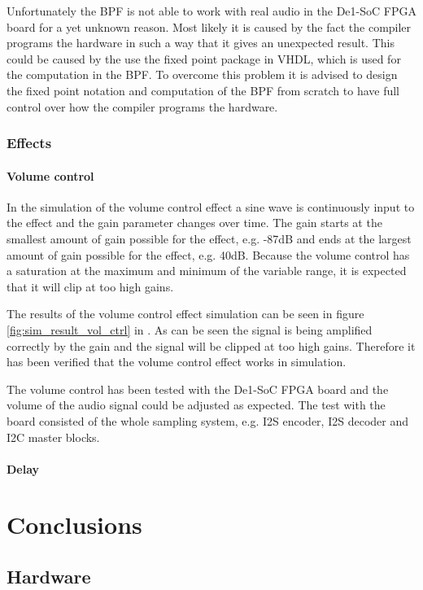 Unfortunately the BPF is not able to work with real audio in the De1-SoC FPGA board for a yet unknown reason. Most likely it is caused by the fact the compiler programs the hardware in such a way that it gives an unexpected result. This could be caused by the use the fixed point package in VHDL, which is used for the computation in the BPF. To overcome this problem it is advised to design the fixed point notation and computation of the BPF from scratch to have full control over how the compiler programs the hardware. 

\subsubsection{Effects}
\paragraph{Volume control}
In the simulation of the volume control effect a sine wave is continuously input to the effect and the gain parameter changes over time. The gain starts at the smallest amount of gain possible for the effect, e.g. -87dB and ends at the largest amount of gain possible for the effect, e.g. 40dB. Because the volume control has a saturation at the maximum and minimum of the variable range, it is expected that it will clip at too high gains. 

The results of the volume control effect simulation can be seen in figure \ref{fig:sim_result_vol_ctrl} in . As can be seen the signal is being amplified correctly by the gain and the signal will be clipped at too high gains. Therefore it has been verified that the volume control effect works in simulation.

The volume control has been tested with the De1-SoC FPGA board and the volume of the audio signal could be adjusted as expected. The test with the board consisted of the whole sampling system, e.g. I2S encoder, I2S decoder and I2C master blocks. 

\paragraph{Delay}


\section{Conclusions}
\subsection{Hardware}

